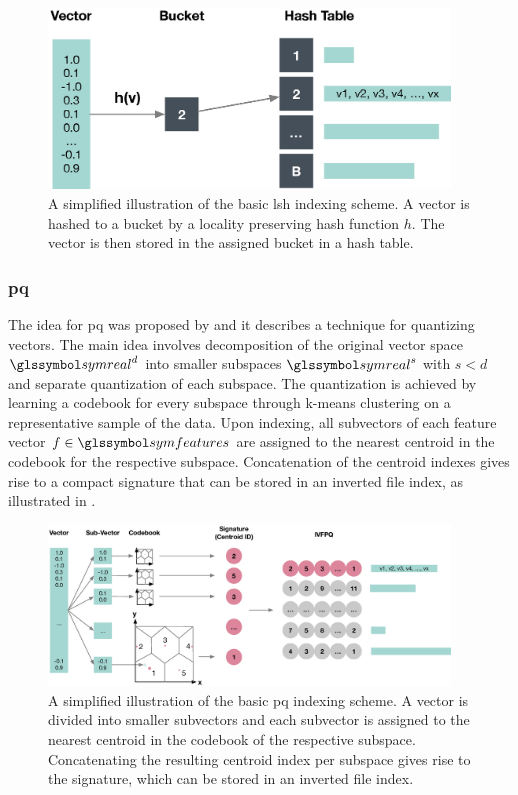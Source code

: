 \begin{figure}[bt]
    \centering
    \includegraphics[width=0.95\textwidth]{figures/lsh}
    \caption{A simplified illustration of the basic \acrshort{lsh} indexing scheme. A vector is hashed to a bucket by a locality preserving hash function $h$. The vector is then stored in the assigned bucket in a hash table.}
    \label{fig:lsh}
\end{figure}

\subsubsection{\acrfull{pq}}

The idea for \acrshort{pq} was proposed by \cite{Jegou:2010Product} and it describes a technique for quantizing vectors. The main idea involves decomposition of the original vector space $\symreal^d$ into smaller subspaces $\symreal^s$ with $s < d$ and separate quantization of each subspace. The quantization is achieved by learning a codebook for every subspace through k-means clustering on a representative sample of the data. Upon indexing, all subvectors of each feature vector $f \in \symfeatures$ are assigned to the nearest centroid in the codebook for the respective subspace. Concatenation of the centroid indexes gives rise to a compact signature that can be stored in an inverted file index, as illustrated in .

\begin{figure}[bt]
    \centering
    \includegraphics[width=0.95\textwidth]{figures/pq}
    \caption{A simplified illustration of the basic \acrshort{pq} indexing scheme. A vector is divided into smaller subvectors and each subvector is assigned to the nearest centroid in the codebook of the respective subspace. Concatenating the resulting centroid index per subspace gives rise to the signature, which can be stored in an inverted file index.}
    \label{fig:pq}
\end{figure}

